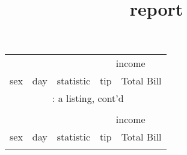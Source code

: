 \documentclass[8pt]{beamer}
\begin{document}
\title[{\makebox[.95\paperwidth]{\hfill\insertframenumber/\inserttotalframenumber}}]{ report \\}
\begin{frame}\titlepage
\end{frame}
\begin{frame}
\hypertarget{a listing}{} 
\begin{longtable}{p{3cm}llll}
\toprule
\multicolumn{3}{c}{}&\multicolumn{2}{c}{income} \\
\cmidrule(lr){4-5}
sex & day & statistic & tip & Total Bill\\
\hline
\endfirsthead
\multicolumn{5}{c}{\tablename~\thetable{}: a listing, cont'd}\\\\
\toprule
\multicolumn{3}{c}{}&\multicolumn{2}{c}{income} \\
\cmidrule(lr){4-5}
sex & day & statistic & tip & Total Bill\\
\hline
\endhead \hline \endfoot \hline


\end{longtable}
\end{frame}
\end{document}
